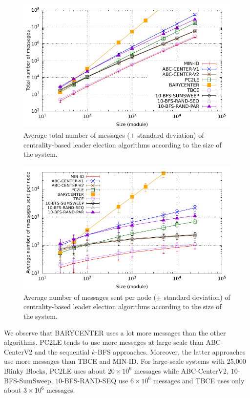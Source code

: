 \begin{figure}[!h]
	\centering
	\includegraphics[width=\gnuplotGraphWidth]{images/centrality/messages}
	\caption{Average total number of messages ($\pm$ standard deviation) of centrality-based leader election algorithms according to the size of the system.\label{fig:centrality:messages}}
\end{figure}

\begin{figure}[!h]
	\centering
	\includegraphics[width=\gnuplotGraphWidth]{images/centrality/avgMessages}
	\caption{Average number of messages sent per node ($\pm$ standard deviation) of centrality-based leader election algorithms according to the size of the system.\label{fig:centrality:avg-messages}}
\end{figure}

We observe that BARYCENTER uses a lot more messages than the other algorithms. PC2LE tends to use more messages at large scale than ABC-CenterV2 and the sequential $k$-BFS approaches. Moreover, the latter approaches use more messages than TBCE and MIN-ID. For large-scale systems with 25,000 Blinky Blocks, PC2LE uses about $20\times10^6$ messages while ABC-CenterV2, $10$-BFS-SumSweep, $10$-BFS-RAND-SEQ use $6\times10^6$ messages and TBCE uses only about $3\times10^6$ messages.


